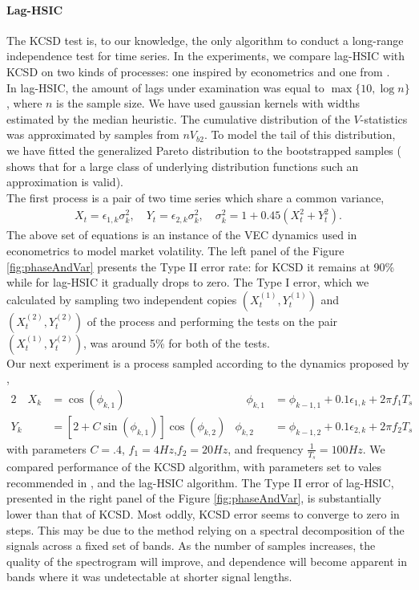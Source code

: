 \paragraph{Lag-HSIC}
The KCSD test \cite{besserve_statistical_2013} is, to our knowledge, the only algorithm to conduct a long-range independence test for time series. In the experiments, we compare lag-HSIC with KCSD on two kinds of processes: one  inspired by econometrics and one from \cite{besserve_statistical_2013}.\\ 
In lag-HSIC, the amount of lags under examination was equal to $\max\{10,\log n\}$, where $n$ is the sample size. We have used gaussian kernels with widths estimated by the median heuristic. The cumulative distribution of the $V$-statistics was approximated by samples from $n V_{b2}$. To model the tail of this distribution, we have fitted the generalized Pareto distribution to the bootstrapped samples (\cite{pickands1975statistical} shows that for a large class of underlying distribution functions such an approximation is valid).\\
The first process is a pair of two time series which share a common variance,   
\begin{align}
\label{eq:dynamics2}
 X_t = \epsilon_{1,k} \sigma_k^2, \quad  Y_t = \epsilon_{2,k}  \sigma_k^2,  \quad \sigma_k^2 = 1 + 0.45(X_t^2 + Y_t^2 ).
\end{align}
The above set of equations is an instance of the VEC dynamics \cite{bauwens_multivariate_2006} used in econometrics to model market volatility. The left panel of the Figure \ref{fig:phaseAndVar} presents the Type II error rate: for KCSD it remains at 90\% while for lag-HSIC it gradually drops to zero. The Type I error, which we calculated by sampling two independent copies $(X^{(1)}_{t},Y^{(1)}_{t})$ and $(X^{(2)}_{t},Y^{(2)}_{t})$ of the process and performing the tests on the pair $(X^{(1)}_{t},Y^{(2)}_{t})$, was around 5\% for both of the tests.\\
Our next experiment is a process sampled according to the dynamics proposed by \cite{besserve_statistical_2013},      
\begin{alignat}{2}
  \quad X_k &= \cos(\phi_{k,1})   &\quad  \phi_{k,1} &= \phi_{k-1,1} + 0.1\epsilon_{1,k} + 2 \pi f_1 T_s \label{eg:dymamics1a} \\  
  Y_k &= [2+C\sin(\phi_{k,1})]\cos(\phi_{k,2})  &   \phi_{k,2} &= \phi_{k-1,2} + 0.1\epsilon_{2,k} + 2 \pi f_2 T_s \label{eg:dymamics1b}
\end{alignat}
with parameters $C=.4$, $f_1=4Hz$,$f_2=20Hz$, and frequency $\frac {1} {T_s} = 100 Hz$. We compared performance of the KCSD algorithm, with parameters set to vales recommended in \cite{besserve_statistical_2013}, and the lag-HSIC algorithm. The Type II error of lag-HSIC, presented in the right panel of the Figure \ref{fig:phaseAndVar}, is substantially lower than that of KCSD. Most oddly, KCSD error seems to converge to zero in steps. This may be due to the method relying on a spectral decomposition of the signals across a fixed set of bands. As the number of samples increases, the quality of the spectrogram will improve, and dependence will become apparent in bands where it was undetectable at shorter signal lengths.
 
